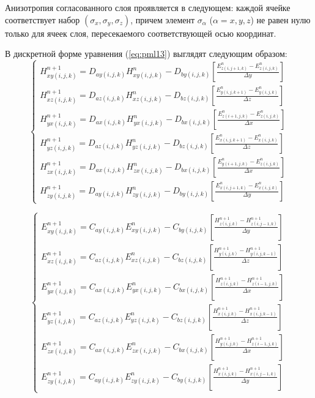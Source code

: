 Анизотропия согласованного слоя проявляется в следующем: каждой ячейке соответствует набор $(\sigma_x,\sigma_y,\sigma_z)$, причем элемент $\sigma_\alpha$ ($\alpha={x,y,z}$) не равен нулю только для ячеек слоя, пересекаемого соответствующей осью координат.


В дискретной форме уравнения (\ref{eq:pml13}) выглядят следующим образом:
\begin{equation}
\left\{
\begin{aligned}
H_{xy (i,j,k)}^{n+1} = D_{ay (i,j,k)} H_{xy (i,j,k)}^{n} - D_{by (i,j,k)}
\left[
    \frac{E_{z (i,j+1,k)}^n - E_{z (i,j,k)}^n}{\Delta y}
\right] \\
H_{xz (i,j,k)}^{n+1} = D_{az (i,j,k)} H_{xz (i,j,k)}^{n} - D_{bz (i,j,k)}
\left[
    \frac{E_{y (i,j,k+1)}^n - E_{y (i,j,k)}^n}{\Delta z}
\right] \\
H_{yx (i,j,k)}^{n+1} = D_{ax (i,j,k)} H_{yx (i,j,k)}^{n} - D_{bx (i,j,k)}
\left[
    \frac{E_{z (i+1,j,k)}^n - E_{z (i,j,k)}^n}{\Delta x}
\right] \\
H_{yz (i,j,k)}^{n+1} = D_{az (i,j,k)} H_{yz (i,j,k)}^{n} - D_{bz (i,j,k)}
\left[
    \frac{E_{x (i,j,k+1)}^n - E_{x (i,j,k)}^n}{\Delta z}
\right] \\
H_{zx (i,j,k)}^{n+1} = D_{ax (i,j,k)} H_{zx (i,j,k)}^{n} - D_{bx (i,j,k)}
\left[
    \frac{E_{y (i+1,j,k)}^n - E_{z (i,j,k)}^n}{\Delta x}
\right] \\
H_{zy (i,j,k)}^{n+1} = D_{ay (i,j,k)} H_{zy (i,j,k)}^{n} - D_{by (i,j,k)}
\left[
    \frac{E_{x (i,j+1,k)}^n - E_{x (i,j,k)}^n}{\Delta y}
\right]
\end{aligned}
\right.
\end{equation}

\begin{equation}
\left\{
\begin{aligned}
E_{xy (i,j,k)}^{n+1} = C_{ay (i,j,k)} E_{xy (i,j,k)}^{n} - C_{by (i,j,k)}
\left[
    \frac{H_{z (i,j,k)}^{n+1} - H_{z (i,j-1,k)}^{n+1}}{\Delta y}
\right] \\
E_{xz (i,j,k)}^{n+1} = C_{az (i,j,k)} E_{xz (i,j,k)}^{n} - C_{bz (i,j,k)}
\left[
    \frac{H_{y (i,j,k)}^{n+1} - H_{y (i,j,k-1)}^{n+1}}{\Delta z}
\right] \\
E_{yx (i,j,k)}^{n+1} = C_{ax (i,j,k)} E_{yx (i,j,k)}^{n} - C_{bx (i,j,k)}
\left[
    \frac{H_{z (i,j,k)}^{n+1} - H_{z (i-1,j,k)}^{n+1}}{\Delta x}
\right] \\
E_{yz (i,j,k)}^{n+1} = C_{az (i,j,k)} E_{yz (i,j,k)}^{n} - C_{bz (i,j,k)}
\left[
    \frac{H_{x (i,j,k)}^{n+1} - H_{x (i,j,k-1)}^{n+1}}{\Delta z}
\right] \\
E_{zx (i,j,k)}^{n+1} = C_{ax (i,j,k)} E_{zx (i,j,k)}^{n} - C_{bx (i,j,k)}
\left[
    \frac{H_{y (i,j,k)}^{n+1} - H_{z (i-1,j,k)}^{n+1}}{\Delta x}
\right] \\
E_{zy (i,j,k)}^{n+1} = C_{ay (i,j,k)} E_{zy (i,j,k)}^{n} - C_{by (i,j,k)}
\left[
    \frac{H_{x (i,j,k)}^{n+1} - H_{x (i,j-1,k)}^{n+1}}{\Delta y}
\right]
\end{aligned}
\right.
\end{equation}

